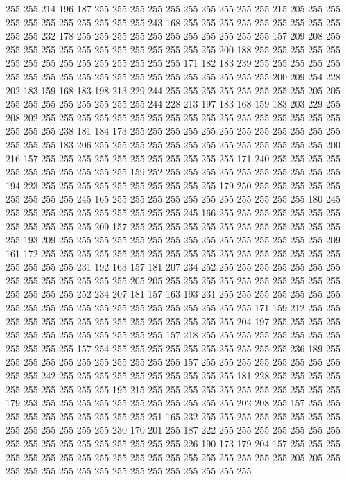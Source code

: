 255 255 214 196 187 255 255 255 255 255 255 255 255 255 255 215 205 255 255 255
255 255 255 255 255 255 255 243 168 255 255 255 255 255 255 255 255 255 255 255
232 178 255 255 255 255 255 255 255 255 255 255 255 157 209 208 255 255 255 255
255 255 255 255 255 255 255 255 255 200 188 255 255 255 255 255 255 255 255 255
255 255 255 255 255 255 171 182 183 239 255 255 255 255 255 255 255 255 255 255
255 255 255 255 255 255 255 255 255 255 200 209 254 228 202 183 159 168 183 198
213 229 244 255 255 255 255 255 255 255 255 205 205 255 255 255 255 255 255 255
255 244 228 213 197 183 168 159 183 203 229 255 208 202 255 255 255 255 255 255
255 255 255 255 255 255 255 255 255 255 255 255 255 255 238 181 184 173 255 255
255 255 255 255 255 255 255 255 255 255 255 255 255 183 206 255 255 255 255 255
255 255 255 255 255 255 255 255 200 216 157 255 255 255 255 255 255 255 255 255
255 255 171 240 255 255 255 255 255 255 255 255 255 255 255 159 252 255 255 255
255 255 255 255 255 255 255 194 223 255 255 255 255 255 255 255 255 255 255 179
250 255 255 255 255 255 255 255 255 255 245 165 255 255 255 255 255 255 255 255
255 255 255 180 245 255 255 255 255 255 255 255 255 255 255 245 166 255 255 255
255 255 255 255 255 255 255 255 255 209 157 255 255 255 255 255 255 255 255 255
255 255 255 255 193 209 255 255 255 255 255 255 255 255 255 255 255 255 255 255
255 209 161 172 255 255 255 255 255 255 255 255 255 255 255 255 255 255 255 255
255 255 255 255 255 231 192 163 157 181 207 234 252 255 255 255 255 255 255 255
255 255 255 255 255 255 255 205 205 255 255 255 255 255 255 255 255 255 255 255
255 255 255 252 234 207 181 157 163 193 231 255 255 255 255 255 255 255 255 255
255 255 255 255 255 255 255 255 255 255 255 255 171 159 212 255 255 255 255 255
255 255 255 255 255 255 255 255 255 255 204 197 255 255 255 255 255 255 255 255
255 255 255 255 255 157 218 255 255 255 255 255 255 255 255 255 255 255 255 157
254 255 255 255 255 255 255 255 255 255 255 236 189 255 255 255 255 255 255 255
255 255 255 255 157 255 255 255 255 255 255 255 255 255 255 242 255 255 255 255
255 255 255 255 255 255 181 228 255 255 255 255 255 255 255 255 255 255 195 215
255 255 255 255 255 255 255 255 255 255 255 179 253 255 255 255 255 255 255 255
255 255 255 255 202 208 255 157 255 255 255 255 255 255 255 255 255 255 251 165
232 255 255 255 255 255 255 255 255 255 255 255 255 255 255 230 170 201 255 187
222 255 255 255 255 255 255 255 255 255 255 255 255 255 255 255 255 255 226 190
173 179 204 157 255 255 255 255 255 255 255 255 255 255 255 255 255 255 255 255
255 255 255 205 205 255 255 255 255 255 255 255 255 255 255 255 255 255 255 255
